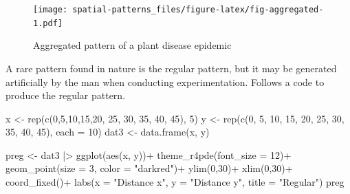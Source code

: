\documentclass[
  letterpaper,
]{book}
\newenvironment{Shaded}{\begin{snugshade}}{\end{snugshade}}
\newcommand{\AttributeTok}[1]{\textcolor[rgb]{0.40,0.45,0.13}{#1}}
\newcommand{\DecValTok}[1]{\textcolor[rgb]{0.68,0.00,0.00}{#1}}
\newcommand{\FunctionTok}[1]{\textcolor[rgb]{0.28,0.35,0.67}{#1}}
\newcommand{\NormalTok}[1]{\textcolor[rgb]{0.00,0.23,0.31}{#1}}
\newcommand{\OtherTok}[1]{\textcolor[rgb]{0.00,0.23,0.31}{#1}}
\newcommand{\SpecialCharTok}[1]{\textcolor[rgb]{0.37,0.37,0.37}{#1}}
\newcommand{\StringTok}[1]{\textcolor[rgb]{0.13,0.47,0.30}{#1}}
\begin{document}
\begin{figure}

\texttt{[image: spatial-patterns\_files/figure-latex/fig-aggregated-1.pdf]} \hfill{}

\caption{\label{fig-aggregated}Aggregated pattern of a plant disease
epidemic}

\end{figure}

A rare pattern found in nature is the regular pattern, but it may be
generated artificially by the man when conducting experimentation.
Follows a code to produce the regular pattern.

\begin{Shaded}
\begin{Highlighting}[]
\NormalTok{x }\OtherTok{\textless{}{-}} \FunctionTok{rep}\NormalTok{(}\FunctionTok{c}\NormalTok{(}\DecValTok{0}\NormalTok{,}\DecValTok{5}\NormalTok{,}\DecValTok{10}\NormalTok{,}\DecValTok{15}\NormalTok{,}\DecValTok{20}\NormalTok{, }\DecValTok{25}\NormalTok{, }\DecValTok{30}\NormalTok{, }\DecValTok{35}\NormalTok{, }\DecValTok{40}\NormalTok{, }\DecValTok{45}\NormalTok{), }\DecValTok{5}\NormalTok{) }
\NormalTok{y }\OtherTok{\textless{}{-}} \FunctionTok{rep}\NormalTok{(}\FunctionTok{c}\NormalTok{(}\DecValTok{0}\NormalTok{, }\DecValTok{5}\NormalTok{, }\DecValTok{10}\NormalTok{, }\DecValTok{15}\NormalTok{, }\DecValTok{20}\NormalTok{, }\DecValTok{25}\NormalTok{, }\DecValTok{30}\NormalTok{, }\DecValTok{35}\NormalTok{, }\DecValTok{40}\NormalTok{, }\DecValTok{45}\NormalTok{), }\AttributeTok{each =} \DecValTok{10}\NormalTok{)}
\NormalTok{dat3 }\OtherTok{\textless{}{-}} \FunctionTok{data.frame}\NormalTok{(x, y)}

\NormalTok{preg }\OtherTok{\textless{}{-}}\NormalTok{ dat3 }\SpecialCharTok{|\textgreater{}}
  \FunctionTok{ggplot}\NormalTok{(}\FunctionTok{aes}\NormalTok{(x, y))}\SpecialCharTok{+}
  \FunctionTok{theme\_r4pde}\NormalTok{(}\AttributeTok{font\_size =} \DecValTok{12}\NormalTok{)}\SpecialCharTok{+}
  \FunctionTok{geom\_point}\NormalTok{(}\AttributeTok{size =} \DecValTok{3}\NormalTok{, }\AttributeTok{color =} \StringTok{"darkred"}\NormalTok{)}\SpecialCharTok{+}
  \FunctionTok{ylim}\NormalTok{(}\DecValTok{0}\NormalTok{,}\DecValTok{30}\NormalTok{)}\SpecialCharTok{+}
  \FunctionTok{xlim}\NormalTok{(}\DecValTok{0}\NormalTok{,}\DecValTok{30}\NormalTok{)}\SpecialCharTok{+}
  \FunctionTok{coord\_fixed}\NormalTok{()}\SpecialCharTok{+}
  \FunctionTok{labs}\NormalTok{(}\AttributeTok{x =} \StringTok{"Distance x"}\NormalTok{, }\AttributeTok{y =} \StringTok{"Distance y"}\NormalTok{, }
       \AttributeTok{title =} \StringTok{"Regular"}\NormalTok{)}
\NormalTok{preg}
\end{Highlighting}
\end{Shaded}
\end{document}
